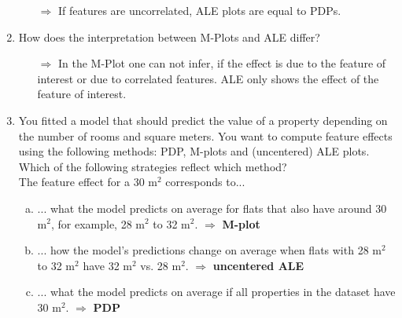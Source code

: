 \begin{enumerate}
    	\begin{itemize}
    		\item[$\Rightarrow$] If features are uncorrelated, ALE plots are equal to PDPs. 
    	\end{itemize}
        \item How does the interpretation between M-Plots and ALE differ?
        \begin{itemize}
        	\item[$\Rightarrow$] In the M-Plot one can not infer, if the effect is due to the feature of interest or due to correlated features. ALE only shows the effect of the feature of interest.
        \end{itemize}


\item You fitted a model that should predict the value of a property depending on 
    the number of rooms and square meters. 
    You want to compute feature effects using the following methods: 
    PDP, M-plots and (uncentered) ALE plots. 
    Which of the following strategies reflect which method? \\
    The feature effect for a 30 m$^2$ corresponds to... 
\begin{enumerate}[a)]
  \item ... what the model predicts on average for flats that also have around 30 m$^2$, for example, 28 m$^2$ to 32 m$^2$. $\Rightarrow$ \textbf{M-plot}
  \item ... how the model's predictions change on average when flats with 28 m$^2$ to 32 m$^2$ have 32 m$^2$ vs. 28 m$^2$. $\Rightarrow$ \textbf{uncentered ALE}
  \item ... what the model predicts on average if all properties in the dataset have 30 m$^2$. $\Rightarrow$ \textbf{PDP}
\end{enumerate}

\end{enumerate}
